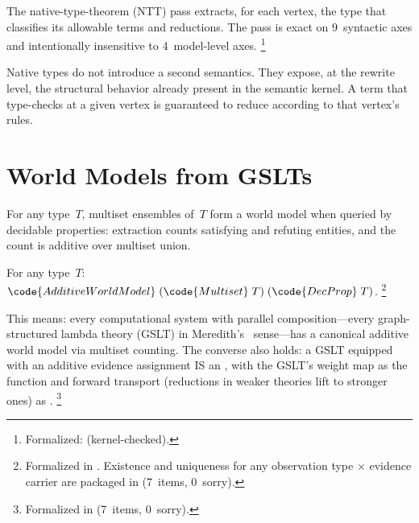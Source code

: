 \documentclass[11pt,openany]{report}
\begin{document}
The native-type-theorem (NTT) pass extracts, for each vertex, the
type that classifies its allowable terms and reductions.  The pass is
exact on 9~syntactic axes and intentionally insensitive to
4~model-level axes.%
\footnote{Formalized:  (kernel-checked).}

Native types do not introduce a second semantics.  They expose, at
the rewrite level, the structural behavior already present in the
semantic kernel.  A term that type-checks at a given vertex is
guaranteed to reduce according to that vertex's rules.


\section{World Models from GSLTs}
\label{sec:gslt-wm}
\label{sec:gslt-open-program}

For any type~$T$, multiset ensembles of~$T$ form a world model when
queried by decidable properties: extraction counts satisfying and
refuting entities, and the count is additive over multiset union.

\begin{theorem}
For any type~$T$:
$\code{AdditiveWorldModel}\;(\code{Multiset}\;T)\;(\code{DecProp}\;T)$.%
\footnote{Formalized in
.
Existence and uniqueness for any observation type $\times$
evidence carrier are packaged in
(7~items, 0~sorry).}
\end{theorem}

\noindent
This means: every computational system with parallel
composition---every graph-structured lambda theory (GSLT) in
Meredith's~\cite{meredith2026ccc} sense---has a canonical additive
world model via multiset counting.  The converse also holds: a
GSLT equipped with an additive evidence assignment IS an
, with the GSLT's weight map as the
 function and forward transport (reductions in
weaker theories lift to stronger ones) as .%
\footnote{Formalized in
(7~items, 0~sorry).}
\end{document}
